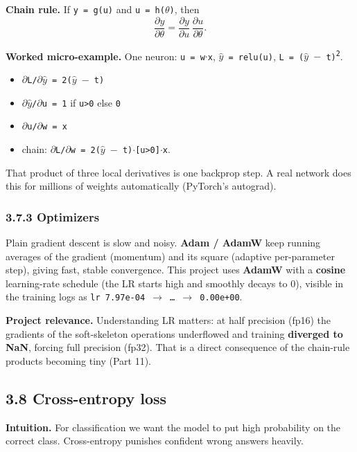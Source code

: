 \documentclass[11pt]{article}
\begin{document}
\textbf{Chain rule.} If \texttt{y = g(u)} and \texttt{u = h($\theta$)}, then \[\frac{\partial y}{\partial \theta} = \frac{\partial y}{\partial u}\,\frac{\partial u}{\partial \theta}.\]

\textbf{Worked micro-example.} One neuron: \texttt{u = w$\cdot$x}, \texttt{$\hat{y}$ = relu(u)}, \texttt{L = ($\hat{y}$ $-$ t)\textsuperscript{2}}.
\begin{itemize}\setlength{\itemsep}{1pt}
\item \texttt{$\partial$L/$\partial$$\hat{y}$ = 2($\hat{y}$ $-$ t)}
\item \texttt{$\partial$$\hat{y}$/$\partial$u = 1} if \texttt{u>0} else \texttt{0}
\item \texttt{$\partial$u/$\partial$w = x}
\item chain: \texttt{$\partial$L/$\partial$w = 2($\hat{y}$ $-$ t)$\cdot$[u>0]$\cdot$x}.
\end{itemize}

That product of three local derivatives is one backprop step. A real network does this for millions of weights automatically (PyTorch's autograd).

\subsubsection*{3.7.3 Optimizers}
Plain gradient descent is slow and noisy. \textbf{Adam / AdamW} keep running averages of the gradient (momentum) and its square (adaptive per-parameter step), giving fast, stable convergence. This project uses \textbf{AdamW} with a \textbf{cosine} learning-rate schedule (the LR starts high and smoothly decays to 0), visible in the training logs as \texttt{lr 7.97e-04 $\rightarrow$ \ldots{} $\rightarrow$ 0.00e+00}.

\textbf{Project relevance.} Understanding LR matters: at half precision (fp16) the gradients of the soft-skeleton operations underflowed and training \textbf{diverged to NaN}, forcing full precision (fp32). That is a direct consequence of the chain-rule products becoming tiny (Part 11).

\subsection*{3.8 Cross-entropy loss}

\textbf{Intuition.} For classification we want the model to put high probability on the correct class. Cross-entropy punishes confident wrong answers heavily.
\end{document}
